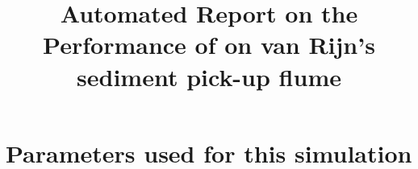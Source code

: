 \documentclass[11pt,a4paper]{article}%
\begin{document}
 

\title{Automated Report on the Performance of \anuga{} on van Rijn's sediment pick-up flume}
\maketitle




\section{Parameters used for this simulation}






\end{document}
